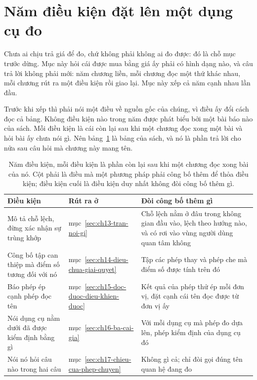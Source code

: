 \section{Năm điều kiện đặt lên một dụng cụ đo}
\label{sec:ch18-nam-dieu-kien}

%
Chưa ai chịu trả giá để đo, chứ không phải không ai đo được: đó là chỗ mục trước
dừng. Mục này hỏi cái được mua bằng giá ấy phải có hình dạng nào, và câu trả lời
không phải mới: năm chương liền, mỗi chương đọc một thứ khác nhau, mỗi chương rút
ra một điều kiện rồi giao lại. Mục này xếp cả năm cạnh nhau lần đầu.

%
Trước khi xếp thì phải nói một điều về nguồn gốc của chúng, vì điều ấy đổi cách
đọc cả bảng. Không điều kiện nào trong năm được phát biểu bởi một bài báo nào của
sách. Mỗi điều kiện là cái còn lại sau khi một chương đọc xong một bài và hỏi bài
ấy chưa nói gì. Nên bảng~\ref{tab:ch18-nam-dieu-kien} là bảng của sách, và nó là
phần trả lời cho nửa sau câu hỏi mà chương này mang tên.

\begin{table}[htbp]
  \centering
  \footnotesize
  \caption{Năm điều kiện, mỗi điều kiện là phần còn lại sau khi một chương đọc
  xong bài của nó. Cột phải là điều mà một phương pháp phải công bố thêm để thỏa
  điều kiện; điều kiện cuối là điều kiện duy nhất không đòi công bố thêm gì.}
  \label{tab:ch18-nam-dieu-kien}
  \begin{tabular}{@{}p{4cm}p{2cm}p{6cm}@{}}
    \toprule
    Điều kiện & Rút ra ở & Đòi công bố thêm gì \\
    \midrule
    Mô tả chỗ lệch, đừng xác nhận sự trùng khớp &
    mục~\ref{sec:ch13-tran-noi-gi} &
    Chỗ lệch nằm ở đâu trong không gian đầu vào, lệch theo hướng nào, và có rơi
    vào vùng người dùng quan tâm không \\
    \addlinespace
    Công bố tập can thiệp mà điểm số tương đối với nó &
    mục~\ref{sec:ch14-dieu-chua-giai-quyet} &
    Tập các phép thay và phép che mà điểm số được tính trên đó \\
    \addlinespace
    Báo phép ép cạnh phép đọc tên &
    mục~\ref{sec:ch15-doc-duoc-dieu-khien-duoc} &
    Kết quả của phép thử ép mỗi đơn vị, đặt cạnh cái tên đọc được từ đơn vị ấy \\
    \addlinespace
    Nói dụng cụ nằm dưới đã được kiểm định bằng gì &
    mục~\ref{sec:ch16-ba-cai-gia} &
    Với mỗi dụng cụ mà phép đo dựa lên, phép kiểm định của dụng cụ đó \\
    \addlinespace
    Nói nó hỏi câu nào trong hai câu &
    mục~\ref{sec:ch17-chieu-cua-phep-chuyen} &
    Không gì cả; chỉ đòi gọi đúng tên quan hệ đang đo \\
    \bottomrule
  \end{tabular}
\end{table}

